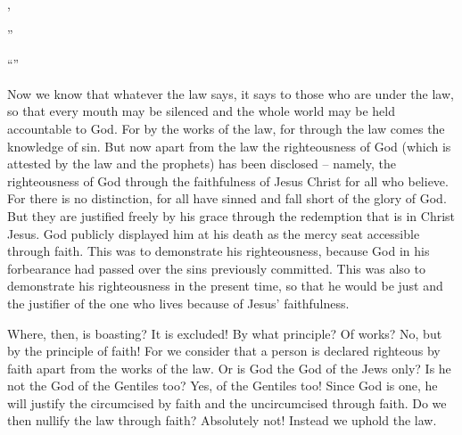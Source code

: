 {{{{},}}
\par }{\Q {}”
\par }{\Q {}“{}”
\par }{\PP {}Now
we know
that
whatever
the law
says,
it says
to those who are under
the law,
so that
every
mouth
may be silenced
and
the whole
world
may be
held accountable
to God.
For
{}
by
the works
of the law,
for
through
the law
comes the knowledge
of sin.
But
now
apart
from the law
the righteousness
of God
(which is attested
by
the law
and
the prophets) has been disclosed –
namely, the righteousness
of God
through
the faithfulness
of Jesus
Christ
for
all
who believe.
For
there is
no distinction,
for
all
have sinned
and
fall short
of the glory
of God.
But they are justified
freely
by his
grace
through
the redemption
that is in
Christ
Jesus.
God
publicly displayed
him at
his
death
as the mercy seat
accessible through
faith.
This was to
demonstrate
his
righteousness,
because
God in his forbearance had passed over
the sins
previously committed.
This was also to demonstrate
his
righteousness
in
the present
time,
so that he would be
just
and
the justifier
of the one who lives because of
Jesus’
faithfulness.
\par }{\PP {}Where,
then,
is boasting? It is excluded! By
what
principle? Of works? No,
but
by
the principle
of faith!
For
we consider
that a person
is declared righteous
by faith
apart from
the works
of the law.
Or
is God the God of the Jews
only? Is
he not the God
of the Gentiles
too? Yes,
of the Gentiles too!
Since
God
is one,
he will justify
the circumcised
by
faith
and
the uncircumcised
through
faith.
Do we
then
nullify
the law
through
faith? Absolutely
not! Instead
we uphold
the law.

}
